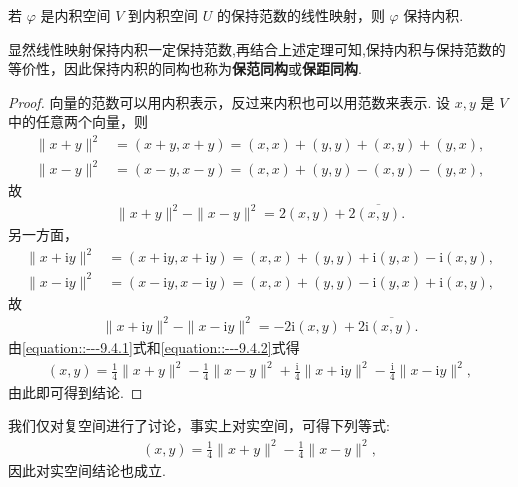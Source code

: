 \documentclass[../../main.tex]{subfiles}
\begin{document}
\begin{theorem}
若 $\varphi$ 是内积空间 $V$ 到内积空间 $U$ 的保持范数的线性映射，则 $\varphi$ 保持内积.
\end{theorem}
\begin{remark}
显然线性映射保持内积一定保持范数,再结合上述定理可知,保持内积与保持范数的等价性，因此保持内积的同构也称为\textbf{保范同构}或\textbf{保距同构}. 
\end{remark}
\begin{proof}
向量的范数可以用内积表示，反过来内积也可以用范数来表示. 设 $x,y$ 是 $V$ 中的任意两个向量，则
\begin{align*}
\|x + y\|^2&=(x + y,x + y)=(x,x)+(y,y)+(x,y)+(y,x),\\
\|x - y\|^2&=(x - y,x - y)=(x,x)+(y,y)-(x,y)-(y,x),
\end{align*}
故
\begin{align}
\|x + y\|^2 - \|x - y\|^2 = 2(x,y) + 2\overline{(x,y)}.\label{equation::---9.4.1}
\end{align}
另一方面，
\begin{align*}
\|x + \mathrm{i}y\|^2&=(x + \mathrm{i}y,x + \mathrm{i}y)=(x,x)+(y,y)+\mathrm{i}(y,x)-\mathrm{i}(x,y),\\
\|x - \mathrm{i}y\|^2&=(x - \mathrm{i}y,x - \mathrm{i}y)=(x,x)+(y,y)-\mathrm{i}(y,x)+\mathrm{i}(x,y),
\end{align*}
故
\begin{align}
\|x + \mathrm{i}y\|^2 - \|x - \mathrm{i}y\|^2 = -2\mathrm{i}(x,y) + 2\mathrm{i}\overline{(x,y)}.\label{equation::---9.4.2}
\end{align}
由\eqref{equation::---9.4.1}式和\eqref{equation::---9.4.2}式得
\begin{align*}
(x,y) = \frac{1}{4}\|x + y\|^2 - \frac{1}{4}\|x - y\|^2 + \frac{\mathrm{i}}{4}\|x + \mathrm{i}y\|^2 - \frac{\mathrm{i}}{4}\|x - \mathrm{i}y\|^2,
\end{align*}
由此即可得到结论.
\end{proof}
\begin{remark}
我们仅对复空间进行了讨论，事实上对实空间，可得下列等式:
\begin{align*}
(x,y) = \frac{1}{4}\|x + y\|^2 - \frac{1}{4}\|x - y\|^2,
\end{align*}
因此对实空间结论也成立. 
\end{remark}
\end{document}
